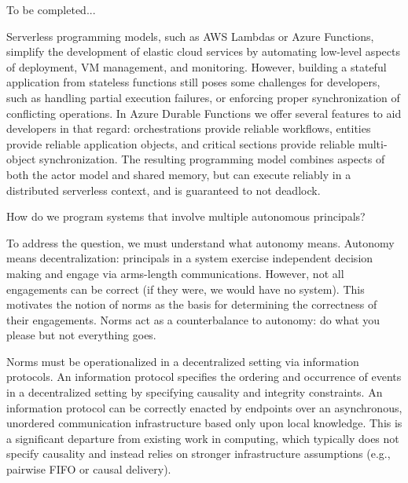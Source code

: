 \documentclass[a4paper,UKenglish]{dagrep-v2018}
\begin{document}

\license

To be completed...


\license

Serverless programming models, such as AWS Lambdas or Azure Functions, simplify the development of elastic cloud services by automating low-level aspects of deployment, VM management, and monitoring. However, building a stateful application from stateless functions still poses some challenges for developers, such as handling partial execution failures, or enforcing proper synchronization of conflicting operations. In Azure Durable Functions we offer several features to aid developers in that regard: orchestrations provide reliable workflows, entities provide reliable application objects, and critical sections provide reliable multi-object synchronization. The resulting programming model combines aspects of both the actor model and shared memory, but can execute reliably in a distributed serverless context, and is guaranteed to not deadlock.


\license

How do we program systems that involve multiple autonomous principals?

To address the question, we must understand what autonomy means. Autonomy means decentralization: principals in a system exercise independent decision making and engage via arms-length communications.  However, not all engagements can be correct (if they were, we would have no system).  This motivates the notion of norms as the basis for determining the correctness of their engagements.  Norms act as a counterbalance to autonomy: do what you please but not everything goes.  

Norms must be operationalized in a decentralized setting via information protocols.  An information protocol specifies the ordering and occurrence of events in a decentralized setting by specifying causality and integrity constraints.  An information protocol can be correctly enacted by endpoints over an asynchronous, unordered communication infrastructure based only upon local knowledge.  This is a significant departure from existing work in computing, which typically does not specify causality and instead relies on stronger infrastructure assumptions (e.g., pairwise FIFO or causal delivery).
\end{document}
